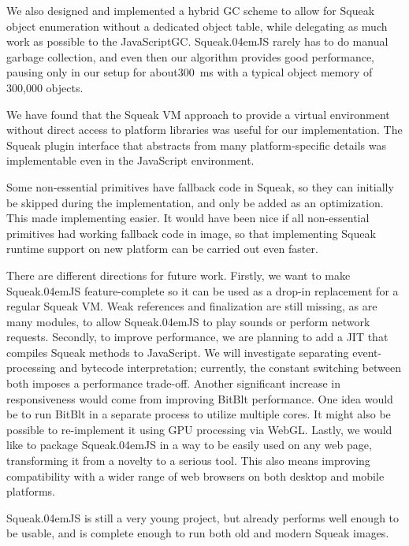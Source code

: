 \documentclass[natbib]{sigplanconf}
\newcommand*\SqueakJS{Squeak\texorpdfstring{\kern.04em}{}JS\xspace}
\newcommand*\JS{JavaScript\xspace}
\begin{document}
We also designed and implemented a hybrid \ac{GC} scheme to allow for
Squeak object enumeration without a dedicated object table, while
delegating as much work as possible to the \JS \ac{GC}. \SqueakJS
rarely has to do manual garbage collection, and even then our
algorithm provides good performance, pausing only in our setup for
about\SI{300}{\ms} with a typical object memory of 300,000
objects.

We have found that the Squeak \ac{VM} approach to provide a virtual
environment without direct access to platform libraries was useful for
our implementation. The Squeak plugin interface that abstracts from
many platform-specific details was implementable even in the \JS
environment.

Some non-essential primitives have fallback code in Squeak, so they
can initially be skipped during the implementation, and only be added
as an optimization. This made implementing easier. It would have been
nice if all non-essential primitives had working fallback code in
image, so that implementing Squeak runtime support on new platform can
be carried out even faster.

There are different directions for future work. Firstly, we want to
make \SqueakJS feature-complete so it can be used as a drop-in
replacement for a regular Squeak \ac{VM}. Weak references and
finalization are still missing, as are many modules, \eg to allow
\SqueakJS to play sounds or perform network requests. Secondly, to
improve performance, we are planning to add a \ac{JIT} that compiles
Squeak methods to \JS. We will investigate separating event-processing
and bytecode interpretation; currently, the constant switching between
both imposes a performance trade-off. Another significant increase in
responsiveness would come from improving BitBlt performance. One idea
would be to run BitBlt in a separate process to utilize multiple
cores. It might also be possible to re-implement it using GPU
processing via WebGL. Lastly, we would like to package \SqueakJS in a
way to be easily used on any web page, transforming it from a novelty
to a serious tool. This also means improving compatibility with a
wider range of web browsers on both desktop and mobile platforms.

\SqueakJS is still a very young project, but already
performs well enough to be usable, and is complete enough to run both
old and modern Squeak images.


{

}


\clearpage
\appendix
\null
\end{document}
